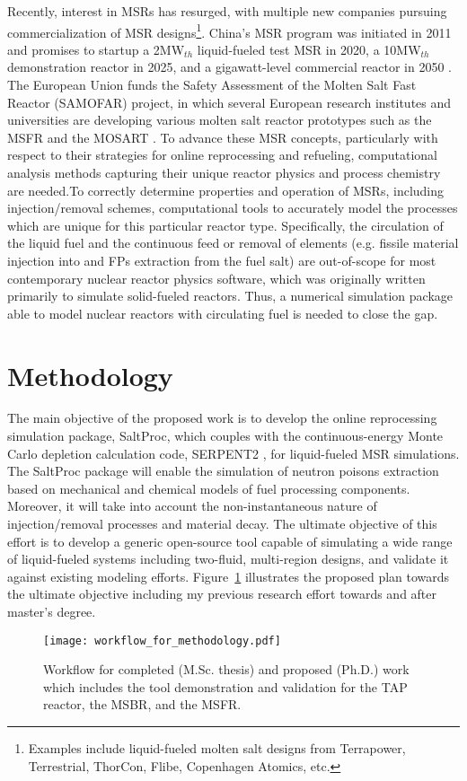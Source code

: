 Recently, interest in \glspl{MSR} has resurged, with multiple new companies 
pursuing commercialization of \gls{MSR} designs\footnote{Examples 
include liquid-fueled molten salt designs from Terrapower, Terrestrial, 
ThorCon, Flibe, Copenhagen Atomics, etc.}. China's \gls{MSR} program 
was initiated in 2011 and promises to startup a 2MW$_{th}$ 
liquid-fueled test \gls{MSR} in 2020, a 10MW$_{th}$ 
demonstration reactor in 2025, and a gigawatt-level 
commercial reactor in 2050 \cite{zhang_review_2018}. The European 
Union funds the Safety Assessment of the Molten Salt Fast Reactor 
(SAMOFAR) project, in which several European research institutes and 
universities are developing various molten salt reactor prototypes 
such as the \gls{MSFR} \cite{fiorina_molten_2013} and the \gls{MOSART} 
\cite{ignatiev_molten_2014}.
To advance these \gls{MSR} concepts, particularly with respect 
to their strategies for online reprocessing and refueling, 
computational analysis methods capturing their unique reactor physics 
and process chemistry are needed.To correctly determine properties and 
operation of \glspl{MSR}, 
including injection/removal schemes, computational tools to accurately 
model the processes which are unique for this particular reactor type. 
Specifically, the circulation of the liquid fuel and the continuous 
feed or removal of elements (e.g. fissile material injection into 
and \glspl{FP} extraction from the fuel salt) are out-of-scope for 
most contemporary nuclear reactor physics software, which was  
originally written primarily to simulate solid-fueled reactors. 
Thus, a numerical simulation package able to model 
nuclear reactors with circulating fuel is needed to close the gap.

\section{Methodology}
The main objective of the proposed work is to develop the online 
reprocessing simulation package, SaltProc, which couples with 
the continuous-energy Monte Carlo depletion 
calculation code, SERPENT2 \cite{leppanen_serpent_2015}, 
for liquid-fueled \gls{MSR} simulations. The SaltProc package 
will enable the simulation of neutron poisons extraction 
based on mechanical and chemical models of fuel processing 
components. 
Moreover, it will take into account the non-instantaneous 
nature of injection/removal processes and material decay. 
The ultimate objective of this effort is to develop a generic 
open-source tool capable of simulating a wide range of 
liquid-fueled systems including two-fluid, multi-region 
designs, and validate it against existing modeling efforts. 
Figure~\ref{fig:workflow_method} illustrates 
the proposed plan towards the ultimate objective 
including my previous research effort towards and after 
master's degree.
\begin{figure}[htp!] %
  \centering
	\texttt{[image: workflow\_for\_methodology.pdf]}
  \caption{Workflow for completed (M.Sc. thesis) and proposed (Ph.D.) work 
  which includes the tool demonstration and validation for the \gls{TAP} 
  reactor, the \gls{MSBR}, and the \gls{MSFR}.}
  \label{fig:workflow_method}
\end{figure}

